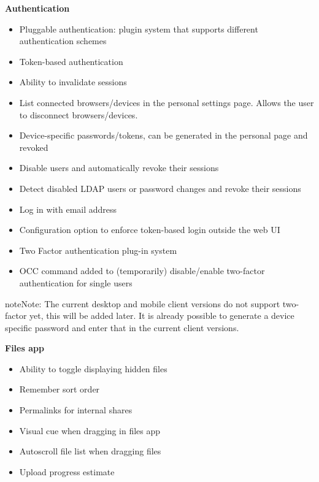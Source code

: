 \documentclass[letterpaper,10pt,english]{sphinxmanual}
\begin{document}
\textbf{Authentication}
\begin{itemize}
\item {} 
Pluggable authentication: plugin system that supports different authentication schemes

\item {} 
Token-based authentication

\item {} 
Ability to invalidate sessions

\item {} 
List connected browsers/devices in the personal settings page. Allows the user to disconnect browsers/devices.

\item {} 
Device-specific passwords/tokens, can be generated in the personal page and revoked

\item {} 
Disable users and automatically revoke their sessions

\item {} 
Detect disabled LDAP users or password changes and revoke their sessions

\item {} 
Log in with email address

\item {} 
Configuration option to enforce token-based login outside the web UI

\item {} 
Two Factor authentication plug-in system

\item {} 
OCC command added to (temporarily) disable/enable two-factor authentication for single users

\end{itemize}

\begin{notice}{note}{Note:}
The current desktop and mobile client versions do not support two-factor yet, this
will be added later. It is already possible to generate a device specific password and
enter that in the current client versions.
\end{notice}

\textbf{Files app}
\begin{itemize}
\item {} 
Ability to toggle displaying hidden files

\item {} 
Remember sort order

\item {} 
Permalinks for internal shares

\item {} 
Visual cue when dragging in files app

\item {} 
Autoscroll file list when dragging files

\item {} 
Upload progress estimate

\end{itemize}
\end{document}
